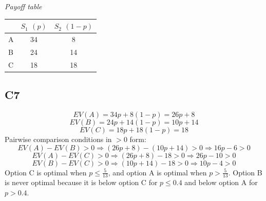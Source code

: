 \begin{ExamProblems}
		\begin{center}
			\textit{Payoff table} \\
			\begin{tabular}{l c c}
				\toprule
				& $S_1$ $(p)$ & $S_2$ $(1-p)$ \\
				\midrule
				A & 34 & 8 \\
				B & 24 & 14 \\
				C & 18 & 18 \\
				\bottomrule
			\end{tabular}
		\end{center}
		
		\subsection*{C7}
		\[
		EV(A)=34p+8(1-p)=26p+8
		\]
		\[
		EV(B)=24p+14(1-p)=10p+14
		\]
		\[
		EV(C)=18p+18(1-p)=18
		\]
		Pairwise comparison conditions in $>0$ form:
		\[
		EV(A)-EV(B)>0 \Rightarrow (26p+8)-(10p+14)>0 \Rightarrow 16p-6>0
		\]
		\[
		EV(A)-EV(C)>0 \Rightarrow (26p+8)-18>0 \Rightarrow 26p-10>0
		\]
		\[
		EV(B)-EV(C)>0 \Rightarrow (10p+14)-18>0 \Rightarrow 10p-4>0
		\]
		Option C is optimal when $p \le \frac{5}{13}$, and option A is optimal when $p>\frac{5}{13}$.
		Option B is never optimal because it is below option C for $p\le 0.4$ and below option A for $p>0.4$.
	\end{ExamProblems}

